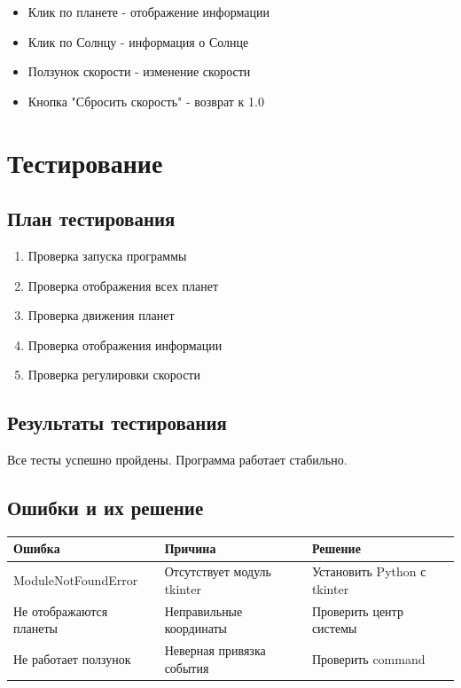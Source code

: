 \documentclass[12pt,a4paper]{article}
\begin{document}
\begin{itemize}
    \item Клик по планете - отображение информации
    \item Клик по Солнцу - информация о Солнце
    \item Ползунок скорости - изменение скорости
    \item Кнопка "Сбросить скорость" - возврат к 1.0
\end{itemize}

\section{Тестирование}

\subsection{План тестирования}

\begin{enumerate}
    \item Проверка запуска программы
    \item Проверка отображения всех планет
    \item Проверка движения планет
    \item Проверка отображения информации
    \item Проверка регулировки скорости
\end{enumerate}

\subsection{Результаты тестирования}

Все тесты успешно пройдены. Программа работает стабильно.

\subsection{Ошибки и их решение}

\begin{tabular}{|p{5cm}|p{5cm}|p{5cm}|}
\hline
\textbf{Ошибка} & \textbf{Причина} & \textbf{Решение} \\
\hline
ModuleNotFoundError & Отсутствует модуль tkinter & Установить Python с tkinter \\
\hline
Не отображаются планеты & Неправильные координаты & Проверить центр системы \\
\hline
Не работает ползунок & Неверная привязка события & Проверить command \\
\hline
\end{tabular}
\end{document}
